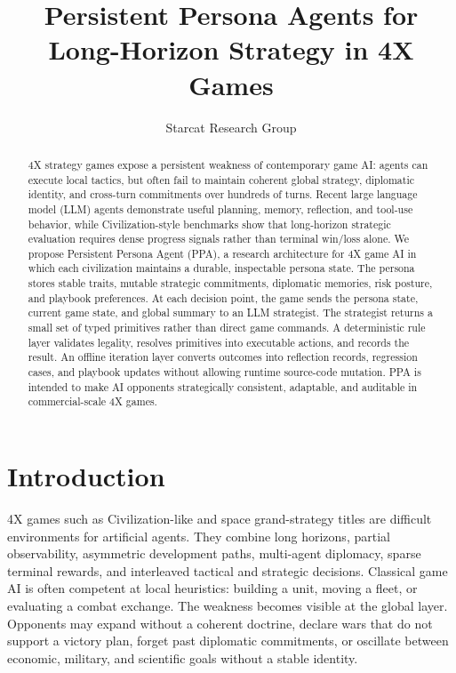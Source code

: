 \documentclass[10pt,twocolumn]{article}
\title{Persistent Persona Agents for Long-Horizon Strategy in 4X Games}
\author{Starcat Research Group}
\date{}
\begin{document}
\maketitle

\begin{abstract}
4X strategy games expose a persistent weakness of contemporary game AI: agents can execute local tactics, but often fail to maintain coherent global strategy, diplomatic identity, and cross-turn commitments over hundreds of turns. Recent large language model (LLM) agents demonstrate useful planning, memory, reflection, and tool-use behavior, while Civilization-style benchmarks show that long-horizon strategic evaluation requires dense progress signals rather than terminal win/loss alone. We propose Persistent Persona Agent (PPA), a research architecture for 4X game AI in which each civilization maintains a durable, inspectable persona state. The persona stores stable traits, mutable strategic commitments, diplomatic memories, risk posture, and playbook preferences. At each decision point, the game sends the persona state, current game state, and global summary to an LLM strategist. The strategist returns a small set of typed primitives rather than direct game commands. A deterministic rule layer validates legality, resolves primitives into executable actions, and records the result. An offline iteration layer converts outcomes into reflection records, regression cases, and playbook updates without allowing runtime source-code mutation. PPA is intended to make AI opponents strategically consistent, adaptable, and auditable in commercial-scale 4X games.
\end{abstract}

\section{Introduction}
4X games such as Civilization-like and space grand-strategy titles are difficult environments for artificial agents. They combine long horizons, partial observability, asymmetric development paths, multi-agent diplomacy, sparse terminal rewards, and interleaved tactical and strategic decisions. Classical game AI is often competent at local heuristics: building a unit, moving a fleet, or evaluating a combat exchange. The weakness becomes visible at the global layer. Opponents may expand without a coherent doctrine, declare wars that do not support a victory plan, forget past diplomatic commitments, or oscillate between economic, military, and scientific goals without a stable identity.
\end{document}
